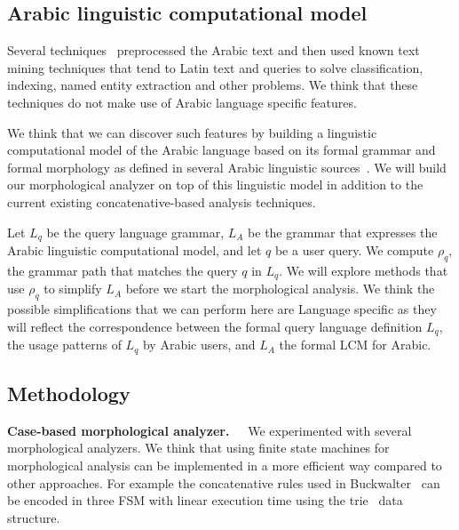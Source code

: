 \documentclass[12pt]{article}
\begin{document}
\subsection{Arabic linguistic computational model }
\label{s:design:lcm}

Several techniques~\cite{AEL07,Ham07,Abd07,MEl03} 
preprocessed the Arabic text and then used known text 
mining techniques that tend to Latin text and queries
to solve classification, indexing, named entity 
extraction and other problems.
We think that these techniques do not make use 
of Arabic language specific features.

We think that we can discover such features by building
a linguistic computational model of the Arabic language
based on its formal grammar and formal morphology
as defined in several Arabic linguistic 
sources~\cite{Sha73,Abd00,Abd001}.
We will build our morphological analyzer on top 
of this linguistic model in addition to the current existing
concatenative-based analysis techniques. 

Let $L_q$ be the query language grammar, 
$L_A$ be the grammar that expresses the Arabic linguistic
computational model, and let $q$ be a user query.
We compute $\rho_q$, the grammar path that matches 
the query $q$ in $L_q$. 
We will explore methods that use $\rho_q$ to simplify 
$L_A$ before we start the morphological analysis. 
We think the possible simplifications that we can perform
here are Language specific as they will reflect the 
correspondence between the formal query language definition $L_q$, 
the usage patterns of $L_q$  by Arabic users, 
and $L_A$ the formal LCM for Arabic. 


\subsection{Methodology}
\label{s:design:method}

\begin{figure}
\end{figure}

{\bf Case-based morphological analyzer.~~}
We experimented with several morphological analyzers.
We think that using finite state machines for morphological analysis
can be implemented in a more efficient way compared to other 
approaches. 
For example the concatenative rules used in Buckwalter~\cite{Tim04}
can be encoded in three FSM with linear execution time using 
the trie~\cite{Aoe:89} data structure. 
\end{document}
